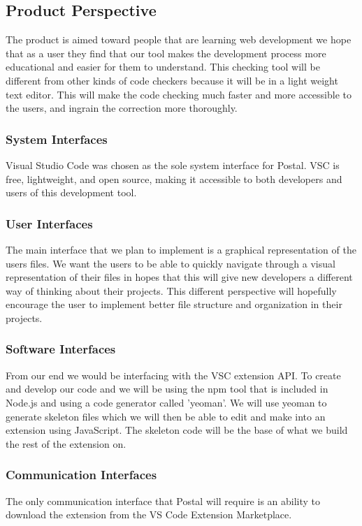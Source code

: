 \documentclass[letterpaper,10pt,titlepage,draftclsnofoot,onecolumn,onesided] {IEEEtran}
\begin{document}
\subsection{Product Perspective}
The product is aimed toward people that are learning web development we hope that as a user they find that our tool makes the development process more educational and easier for them to understand. 
This checking tool will be different from other kinds of code checkers because it will be in a light weight text editor.
This will make the code checking much faster and more accessible to the users, and ingrain the correction more thoroughly.

\subsubsection{System Interfaces}
Visual Studio Code was chosen as the sole system interface for Postal.
VSC is free, lightweight, and open source, making it accessible to both developers and users of this development tool.

\subsubsection{User Interfaces}
The main interface that we plan to implement is a graphical representation of the users files. 
We want the users to be able to quickly navigate through a visual representation of their files in hopes that this will give new developers a different way of thinking about their projects.
This different perspective will hopefully encourage the user to implement better file structure and organization in their projects.

\subsubsection{Software Interfaces}
From our end we would be interfacing with the VSC extension API. To create and develop our code and we will be using the npm tool that is included in Node.js and using a code generator called 'yeoman'. We will use yeoman to generate skeleton files which we will then be able to edit and make into an extension using JavaScript. The skeleton code will be the base of what we build the rest of the extension on. 

\subsubsection{Communication Interfaces}
The only communication interface that Postal will require is an ability to download the extension from the VS Code Extension Marketplace.
\end{document}
